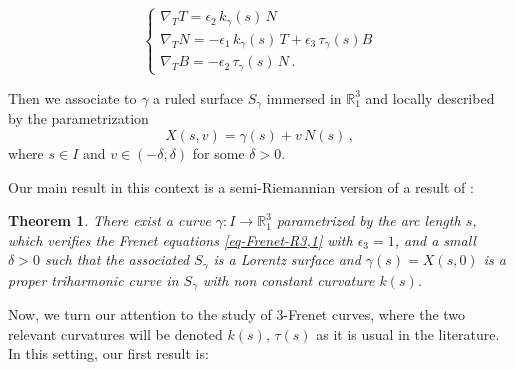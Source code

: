\documentclass[11pt]{amsart}
\theoremstyle{plain}
\newtheorem{theorem}                {Theorem}      [section]
\theoremstyle{definition}
\numberwithin{equation}{section}
\def \R{{\mathbb R}}
\begin{document}
\begin{equation}\label{eq-Frenet-R3,1}
\begin{cases}
\nabla_T T = \epsilon_2 \,k_\gamma(s) \,N \\
\nabla_T N = -\epsilon_1\,k_\gamma(s) \,T + \epsilon_3 \, \tau_\gamma(s) B \\
\nabla_T B = - \epsilon_2 \,\tau_\gamma(s) \,N \,.
\end{cases} 
\end{equation}

Then we associate to $\gamma$ a ruled surface $S_\gamma$ immersed in $\R^3_1$ and locally described by the parametrization
\begin{equation}%
X(s,v)=\gamma(s)+v\,N(s) \,,
\end{equation}
where $s\in I$ and $v \in (-\delta, \delta)$ for some $\delta>0$.

Our main result in this context is a semi-Riemannian version of a result of \cite{MR4308322}:
\begin{theorem}\label{Th-trihar-curve-k-nonconstant}
There exist a curve $\gamma: I \to \R^3_1$ parametrized by the arc length $s$, which verifies the Frenet equations \eqref{eq-Frenet-R3,1} with $\epsilon_3=1$, and a small $\delta>0$ such that the associated $S_\gamma$ is a Lorentz surface and $\gamma(s)=X(s,0)$ is a proper triharmonic curve in $S_\gamma$ with non constant curvature $k(s)$.
\end{theorem}

Now, we turn our attention to the study of $3$-Frenet curves, where the two relevant curvatures will be denoted $k(s),\,\tau(s)$ as it is usual in the literature. In this setting, our first result is:
\end{document}
